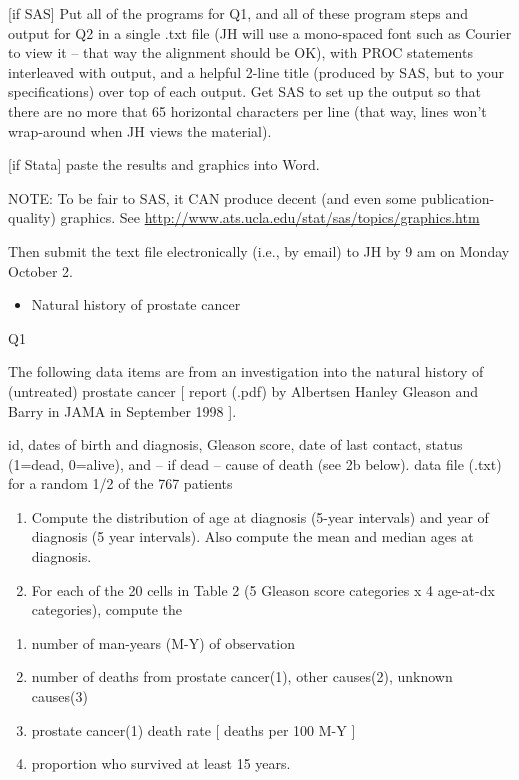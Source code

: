 \documentclass[]{book}
\providecommand{\tightlist}{%
  \setlength{\itemsep}{0pt}\setlength{\parskip}{0pt}}
\begin{document}
{[}if SAS{]} Put all of the programs for Q1, and all of these program steps and output for Q2 in a single .txt file (JH will use a mono-spaced font such as Courier to view it -- that way the alignment should be OK), with PROC statements interleaved with output, and a helpful 2-line title (produced by SAS, but to your specifications) over top of each output. Get SAS to set up the output so that there are no more that 65 horizontal characters per line (that way, lines won't wrap-around when JH views the material).

{[}if Stata{]} paste the results and graphics into Word.

NOTE: To be fair to SAS, it CAN produce decent (and even some publication-quality) graphics. See \url{http://www.ats.ucla.edu/stat/sas/topics/graphics.htm}

Then submit the text file electronically (i.e., by email) to JH by 9 am on Monday October 2.

\begin{itemize}
\tightlist
\item
  Natural history of prostate cancer
\end{itemize}

Q1

The following data items are from an investigation into the natural history of (untreated) prostate cancer {[} report (.pdf) by Albertsen Hanley Gleason and Barry in JAMA in September 1998 {]}.

id, dates of birth and diagnosis, Gleason score, date of last contact, status (1=dead, 0=alive), and -- if dead -- cause of death (see 2b below). data file (.txt) for a random 1/2 of the 767 patients

\begin{enumerate}
\def\labelenumi{\arabic{enumi}.}
\item
  Compute the distribution of age at diagnosis (5-year intervals) and year of diagnosis (5 year intervals). Also compute the mean and median ages at diagnosis.
\item
  For each of the 20 cells in Table 2 (5 Gleason score categories x 4 age-at-dx categories), compute the
\end{enumerate}

\begin{enumerate}
\def\labelenumi{\alph{enumi}.}
\item
  number of man-years (M-Y) of observation
\item
  number of deaths from prostate cancer(1), other causes(2), unknown causes(3)
\item
  prostate cancer(1) death rate {[} deaths per 100 M-Y {]}
\item
  proportion who survived at least 15 years.
\end{enumerate}
\end{document}
